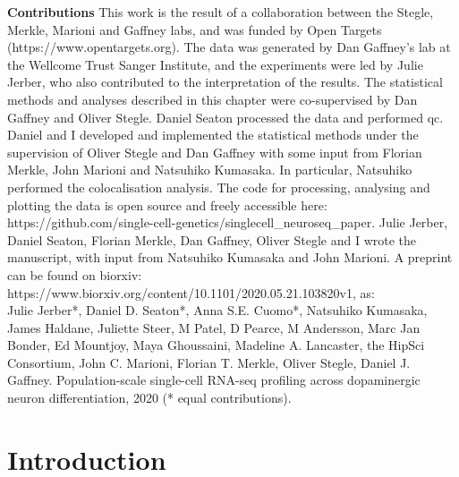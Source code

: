 \newpage

\begin{Comment2}

\hspace{-3mm}\textbf{Contributions} This work is the result of a collaboration between the Stegle, Merkle, Marioni and Gaffney labs, and was funded by Open Targets 
(https://www.opentargets.org).
The data was generated by Dan Gaffney’s lab at the Wellcome Trust Sanger Institute, and the experiments were led by Julie Jerber, who also contributed to the interpretation of the results. 
The statistical methods and analyses described in this chapter were co-supervised by Dan Gaffney and Oliver Stegle. 
Daniel Seaton processed the data and performed \gls{qc}. 
Daniel and I developed and implemented the statistical methods under the supervision of Oliver Stegle and Dan Gaffney with some input from Florian Merkle, John Marioni and Natsuhiko Kumasaka.
In particular, Natsuhiko performed the colocalisation analysis.
The code for processing, analysing and plotting the data is open source and freely accessible here: https://github.com/single-cell-genetics/singlecell\_neuroseq\_paper.
Julie Jerber, Daniel Seaton, Florian Merkle, Dan Gaffney, Oliver Stegle and I wrote the manuscript, with input from Natsuhiko Kumasaka and John Marioni.
A preprint \cite{jerber2020population} can be found on biorxiv: https://www.biorxiv.org/content/10.1101/2020.05.21.103820v1, as:\\

Julie Jerber*, Daniel D. Seaton*, Anna S.E. Cuomo*, Natsuhiko Kumasaka, James Haldane, Juliette Steer, M Patel, D Pearce, M Andersson, Marc Jan Bonder, Ed Mountjoy, Maya Ghoussaini, Madeline A. Lancaster, the HipSci Consortium, John C. Marioni, Florian T. Merkle, Oliver Stegle, Daniel J. Gaffney. Population-scale single-cell RNA-seq profiling across dopaminergic neuron differentiation, 2020 (* equal contributions).

\end{Comment2}

\newpage

\section{Introduction}

